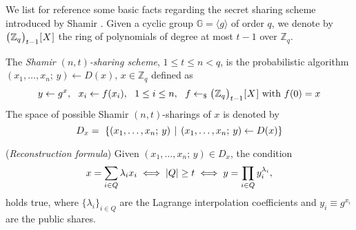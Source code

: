 \documentclass{iacrtrans}
\begin{document}
\noindent
We list for reference some basic facts regarding
the secret sharing scheme introduced by Shamir
\cite{paper_shamir}.
Given a cyclic group $\mathbb{G} = \langle g \rangle$ of order $q$,
we denote by
$
\big(
	\hspace{0.3pt}
	\mathbb{Z}_q
	\hspace{0.3pt}
	\big)_{t-1}
	\hspace{0.3pt}
	[
		\hspace{0.5pt}
		X
		\hspace{0.5pt}
	]
$
the ring of polynomials of degree
at most $t-1$ over $\mathbb{Z}_q$.

\begin{defn}\label{shamir_definition}
The \textit{Shamir $(n, t)$-sharing scheme}, $1 \le t \le n < q$,
is the probabilistic algorithm
$(x_1, \dots, x_n;\hspace{2pt} y) \leftarrow D(x),
\hspace{2pt} x \in \mathbb{Z}_q$
defined as
\vspace{5pt}
\begin{equation*}
y \leftarrow g ^ x,
\ \ x_i \leftarrow f(x_i),
\ \ 1 \le i \le n,
\ \ f \leftarrow_\$ \big(
	\hspace{0.3pt}
	\mathbb{Z}_q
	\hspace{0.3pt}
	\big)_{t-1}
	\hspace{0.3pt}
	[
		\hspace{0.5pt}
		X
		\hspace{0.5pt}
	]
\textup{ with }
f(0) = x
\hspace{0pt}
\vspace{5pt}
\end{equation*}
The space of possible Shamir $(n,t)$-sharings of $x$
is denoted by
\vspace{5pt}
\begin{equation*}
D_x =\
\left\{(x_1, \dots, x_n;\hspace{2pt} y)
\hspace{4pt}
\middle\vert
\hspace{4pt}
(x_1, \dots, x_n;\hspace{2pt} y) \leftarrow D(x)
\right\}
\hspace{0pt}
\vspace{5pt}
\end{equation*}
\end{defn}

\begin{rem}\label{shamir_reconstruction}
(\textit{Reconstruction formula})
Given $(x_1, \dots, x_n;\hspace{2pt} y) \in D_x$,
the condition
\vspace{5pt}
\begin{equation}\label{shamir_threshold_condition}
x = \sum_{i \in Q} \lambda_i x_i
\iff
|Q| \ge t
\iff
y = \prod_{i \in Q} y_i^{\lambda_i},
\vspace{5pt}
\end{equation}
holds true,
where $\{\lambda_i\}_{i \in Q}$ are the
Lagrange interpolation coefficients
and $y_i\equiv g ^ {x_i}$
are the public shares.
\end{rem}
\end{document}
